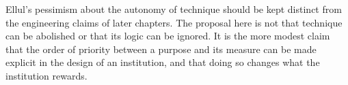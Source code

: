 \begin{remark}
Ellul's pessimism about the autonomy of technique should be kept distinct from the engineering claims of later chapters. The proposal here is not that technique can be abolished or that its logic can be ignored. It is the more modest claim that the order of priority between a purpose and its measure can be made explicit in the design of an institution, and that doing so changes what the institution rewards.
\end{remark}
